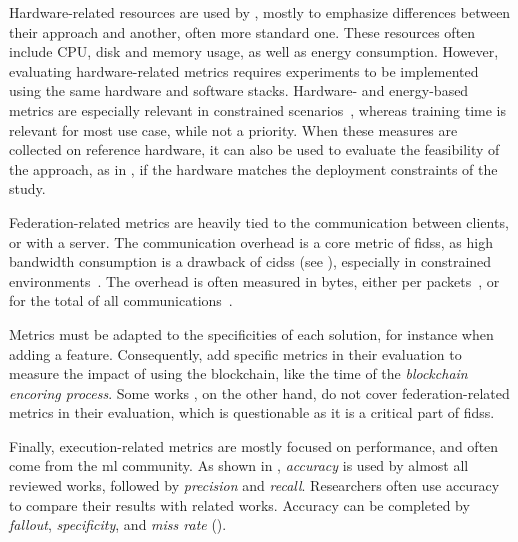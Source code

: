 Hardware-related resources are used by \cite{rathore_BlockSecIoTNetBlockchainbaseddecentralized_2019,zhao_MultiTaskNetworkAnomaly_2019}, mostly to emphasize differences between their approach and another, often more standard one.
These resources often include CPU, disk and memory usage, as well as energy consumption.
However, evaluating hardware-related metrics requires experiments to be implemented using the same hardware and software stacks.
Hardware- and energy-based metrics are especially relevant in constrained scenarios~\cite{nguyen_DIoTFederatedSelflearning_2019,schneble_Attackdetectionusing_2019}, whereas training time is relevant for most use case, while not a priority.
When these measures are collected on reference hardware, it can also be used to evaluate the feasibility of the approach, as in \cite{nguyen_DIoTFederatedSelflearning_2019}, if the hardware matches the deployment constraints of the study.

Federation-related metrics are heavily tied to the communication between clients, or with a server.
The communication overhead is a core metric of \glspl{fids}, as high bandwidth consumption is a drawback of \glspl{cids} (see ), especially in constrained environments~\cite{qin_LineSpeedScalableIntrusion_2020a}.
The overhead is often measured in bytes, either per packets~\cite{pahl_AllEyesYou_2018}, or for the total of all communications~\cite{schneble_Attackdetectionusing_2019,zhang_BlockchainbasedFederatedLearning_2020}.

Metrics must be adapted to the specificities of each solution, for instance when adding a feature.
Consequently, \textcite{zhang_BlockchainbasedFederatedLearning_2020} add specific metrics in their evaluation to measure the impact of using the blockchain, like the time of the \emph{blockchain encoring process}.
Some works \cite{rathore_BlockSecIoTNetBlockchainbaseddecentralized_2019,li_DeepFedFederatedDeep_2020,chen_Networkanomalydetection_2020,fan_IoTDefenderFederatedTransfer_2020,rahman_InternetThingsIntrusion_2020,Sun2020,al-athbaal-marri_FederatedMimicLearning_2020,Popoola2021}, on the other hand, do not cover federation-related metrics in their evaluation, which is questionable as it is a critical part of \glspl{fids}.

Finally, execution-related metrics are mostly focused on performance, and often come from the \gls{ml} community.
As shown in , \emph{accuracy} is used by almost all reviewed works, followed by \emph{precision} and \emph{recall}.
Researchers often use accuracy to compare their results with related works.
Accuracy can be completed by \emph{fallout}, \emph{specificity}, and \emph{miss rate} ().


